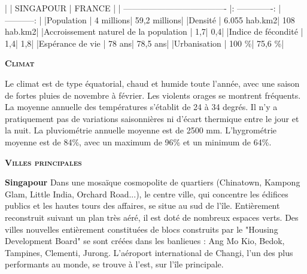 \begin{multicols}{2}
|                                       |     SINGAPOUR   |    FRANCE    |
| ------------------------------------- |: -------------: | -----------: |
|Population                             |       4 millions| 59,2 millions|
|Densité                                |     6.055 hab.km2|   108 hab.km2|
|Accroissement naturel de la population |              1,7|           0,4|
|Indice de fécondité                    |              1,4|           1,8|
|Espérance de vie                       |           78 ans|      78,5 ans|
|Urbanisation                           |            100 \%|        75,6 \%|

\textbf{\textsc{Climat}}

Le climat est de type équatorial, chaud et humide toute l'année, avec une saison de fortes pluies de novembre à février. Les violents orages se montrent fréquents. La moyenne annuelle des températures s'établit de 24 à 34 degrés. Il n'y a pratiquement pas de variations saisonnières ni d'écart thermique entre le jour et la nuit. La pluviométrie annuelle moyenne est de 2500 mm. L'hygrométrie moyenne est de 84\%, avec un maximum de 96\% et un minimum de 64\%.

\textbf{\textsc{Villes principales}}

\textbf{Singapour}
Dans une mosaïque cosmopolite de quartiers (Chinatown, Kampong Glam, Little India, Orchard Road...), le centre ville, qui concentre les édifices publics et les hautes tours des affaires, se situe au sud de l'île. Entièrement reconstruit suivant un plan très aéré, il est doté de nombreux espaces verts. Des villes nouvelles entièrement constituées de blocs construits par le "Housing Development Board" se sont créées dans les banlieues : Ang Mo Kio, Bedok, Tampines, Clementi, Jurong. L'aéroport international de Changi, l'un des plus performants au monde, se trouve à l'est, sur l'île principale.

\end{multicols}

\vfill
